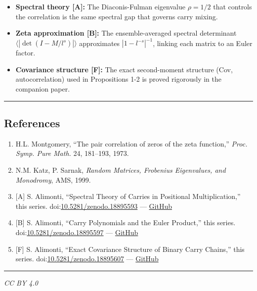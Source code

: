 \documentclass[
  11pt,
]{article}
\providecommand{\tightlist}{%
  \setlength{\itemsep}{0pt}\setlength{\parskip}{0pt}}
\begin{document}
\begin{itemize}
\tightlist
\item
  \textbf{Spectral theory {[}A{]}:} The Diaconis-Fulman eigenvalue
  \(\rho = 1/2\) that controls the correlation is the same spectral gap that
  governs carry mixing.
\item
  \textbf{Zeta approximation {[}B{]}:} The ensemble-averaged spectral
  determinant \(\langle|\det(I - M/l^s)|\rangle\) approximates
  \(|1 - l^{-s}|^{-1}\), linking each matrix to an Euler factor.
\item
  \textbf{Covariance structure {[}F{]}:} The exact second-moment structure (Cov,
  autocorrelation) used in Propositions 1-2 is proved rigorously in the
  companion paper.
\end{itemize}

\begin{center}\rule{0.5\linewidth}{0.5pt}\end{center}

\newpage

\subsection{References}\label{references}

\begin{enumerate}
\def\labelenumi{\arabic{enumi}.}
\tightlist
\item
  H.L. Montgomery, ``The pair correlation of zeros of the zeta function,''
  \emph{Proc. Symp. Pure Math.} 24, 181--193, 1973.
\item
  N.M. Katz, P. Sarnak, \emph{Random Matrices, Frobenius Eigenvalues, and
  Monodromy}, AMS, 1999.
\item
  {[}A{]} S. Alimonti, ``Spectral Theory of Carries in Positional
  Multiplication,'' this series.
  doi:\href{https://doi.org/10.5281/zenodo.18895593}{10.5281/zenodo.18895593}
  ---
  \href{https://github.com/stefanoalimonti/carry-arithmetic-A-spectral-theory}{GitHub}
\item
  {[}B{]} S. Alimonti, ``Carry Polynomials and the Euler Product,'' this series.
  doi:\href{https://doi.org/10.5281/zenodo.18895597}{10.5281/zenodo.18895597}
  ---
  \href{https://github.com/stefanoalimonti/carry-arithmetic-B-zeta-approximation}{GitHub}
\item
  {[}F{]} S. Alimonti, ``Exact Covariance Structure of Binary Carry Chains,''
  this series.
  doi:\href{https://doi.org/10.5281/zenodo.18895607}{10.5281/zenodo.18895607}
  ---
  \href{https://github.com/stefanoalimonti/carry-arithmetic-F-covariance-structure}{GitHub}
\end{enumerate}

\begin{center}\rule{0.5\linewidth}{0.5pt}\end{center}

\emph{CC BY 4.0}
\end{document}
